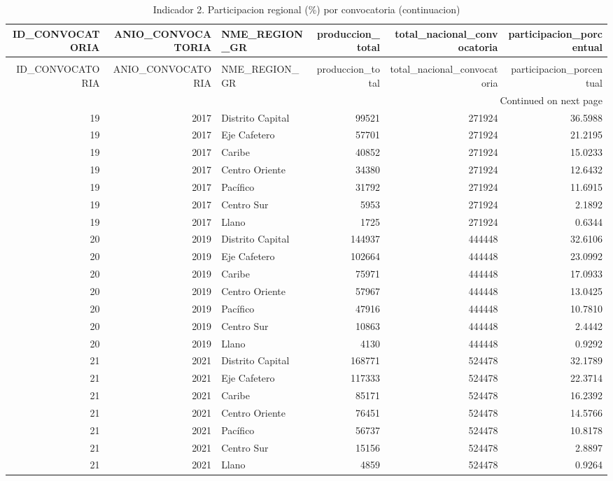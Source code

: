 \begin{longtable}{rrlrrr}

\caption{Indicador 2. Participacion regional (\%) por convocatoria}
\label{tab:ind02_conv} \\

\toprule
ID\_CONVOCATORIA & ANIO\_CONVOCATORIA & NME\_REGION\_GR & produccion\_total & total\_nacional\_convocatoria & participacion\_porcentual \\
\midrule
\endfirsthead

\caption[]{Indicador 2. Participacion regional (\%) por convocatoria (continuacion)} \\
\toprule
ID\_CONVOCATORIA & ANIO\_CONVOCATORIA & NME\_REGION\_GR & produccion\_total & total\_nacional\_convocatoria & participacion\_porcentual \\
\midrule
\endhead

\midrule
\multicolumn{6}{r}{Continued on next page} \\
\midrule
\endfoot

\bottomrule
\endlastfoot

19 & 2017 & Distrito Capital & 99521 & 271924 & 36.5988 \\
19 & 2017 & Eje Cafetero & 57701 & 271924 & 21.2195 \\
19 & 2017 & Caribe & 40852 & 271924 & 15.0233 \\
19 & 2017 & Centro Oriente & 34380 & 271924 & 12.6432 \\
19 & 2017 & Pacífico & 31792 & 271924 & 11.6915 \\
19 & 2017 & Centro Sur & 5953 & 271924 & 2.1892 \\
19 & 2017 & Llano & 1725 & 271924 & 0.6344 \\

20 & 2019 & Distrito Capital & 144937 & 444448 & 32.6106 \\
20 & 2019 & Eje Cafetero & 102664 & 444448 & 23.0992 \\
20 & 2019 & Caribe & 75971 & 444448 & 17.0933 \\
20 & 2019 & Centro Oriente & 57967 & 444448 & 13.0425 \\
20 & 2019 & Pacífico & 47916 & 444448 & 10.7810 \\
20 & 2019 & Centro Sur & 10863 & 444448 & 2.4442 \\
20 & 2019 & Llano & 4130 & 444448 & 0.9292 \\

21 & 2021 & Distrito Capital & 168771 & 524478 & 32.1789 \\
21 & 2021 & Eje Cafetero & 117333 & 524478 & 22.3714 \\
21 & 2021 & Caribe & 85171 & 524478 & 16.2392 \\
21 & 2021 & Centro Oriente & 76451 & 524478 & 14.5766 \\
21 & 2021 & Pacífico & 56737 & 524478 & 10.8178 \\
21 & 2021 & Centro Sur & 15156 & 524478 & 2.8897 \\
21 & 2021 & Llano & 4859 & 524478 & 0.9264 \\

\end{longtable}